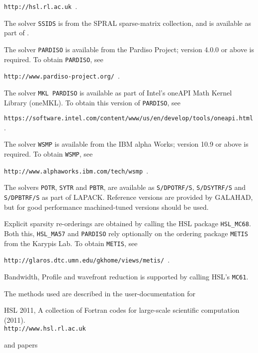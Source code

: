 \documentclass{galahad}
\begin{document}
{\tt http://hsl.rl.ac.uk }.

\noindent
The solver {\tt SSIDS} is from the SPRAL sparse-matrix collection,
and is available as part of \galahad.
%

\noindent
The solver {\tt PARDISO} is available from the Pardiso Project;
version 4.0.0 or above is required.
To obtain {\tt PARDISO}, see

{\tt http://www.pardiso-project.org/ }.

\noindent
The solver {\tt MKL PARDISO} is available as part of Intel's oneAPI Math Kernel
Library (oneMKL).
To obtain this version of {\tt PARDISO}, see

{\tt https://software.intel.com/content/www/us/en/develop/tools/oneapi.html }.

\noindent
The solver {\tt WSMP} is available from the IBM alpha Works;
version 10.9 or above is required.
To obtain {\tt WSMP}, see

{\tt http://www.alphaworks.ibm.com/tech/wsmp }.

\noindent
The solvers {\tt POTR}, {\tt SYTR} and {\tt PBTR},
are available as
{\tt S/DPOTRF/S},
{\tt S/DSYTRF/S} and {\tt S/DPBTRF/S}
as part of LAPACK. Reference versions
are provided by GALAHAD, but for good performance
machined-tuned versions should be used.

\noindent
Explicit sparsity re-orderings are obtained by calling the HSL package
{\tt HSL\_MC68}.
Both this, {\tt HSL\_MA57} and {\tt PARDISO} rely optionally
on the ordering package {\tt METIS} from the Karypis Lab. To obtain
{\tt METIS}, see

{\tt http://glaros.dtc.umn.edu/gkhome/views/metis/ }.

\noindent
Bandwidth, Profile and wavefront reduction is supported by
calling HSL's {\tt MC61}.

\vspace*{1mm}

\galreferences
\vspace*{1mm}

\noindent
The methods used are described in the user-documentation for
\vspace*{1mm}

\noindent
HSL 2011, A collection of {F}ortran codes for large-scale scientific
 computation (2011). \\
 {\tt http://www.hsl.rl.ac.uk}

\noindent
and papers
\end{document}
